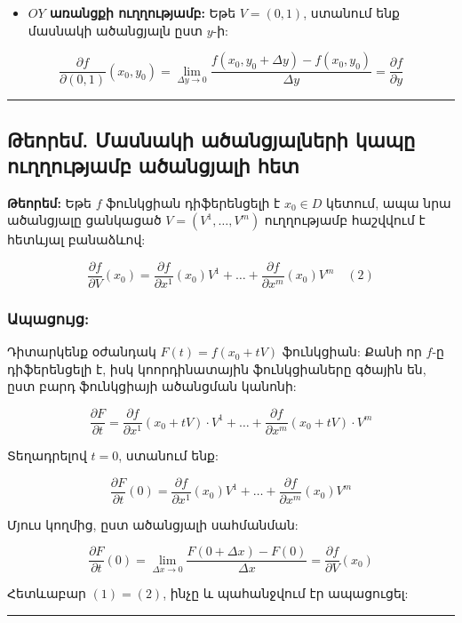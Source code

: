 \documentclass[12pt, a4paper]{article}
\begin{document}
\begin{itemize}
    \item \textbf{$OY$ առանցքի ուղղությամբ:} Եթե $V = (0, 1)$, ստանում ենք մասնակի ածանցյալն ըստ $y$-ի:
\end{itemize}

$$\frac{\partial f}{\partial (0,1)}(x_0, y_0) = \lim_{\Delta y \to 0} \frac{f(x_0, y_0 + \Delta y) - f(x_0, y_0)}{\Delta y} = \frac{\partial f}{\partial y} \text{}$$

\vspace{1em}
\hrule
\vspace{1em}

\subsection{Թեորեմ. Մասնակի ածանցյալների կապը ուղղությամբ ածանցյալի հետ}

\textbf{Թեորեմ:} Եթե $f$ ֆունկցիան դիֆերենցելի է $x_0 \in D$ կետում, ապա նրա ածանցյալը ցանկացած $V = (V^1, \dots, V^m)$ ուղղությամբ հաշվվում է հետևյալ բանաձևով:

$$\frac{\partial f}{\partial V}(x_0) = \frac{\partial f}{\partial x^1}(x_0)V^1 + \dots + \frac{\partial f}{\partial x^m}(x_0)V^m \quad (2) \text{}$$

\subsubsection{Ապացույց:}

Դիտարկենք օժանդակ $F(t) = f(x_0 + tV)$ ֆունկցիան: Քանի որ $f$-ը դիֆերենցելի է, իսկ կոորդինատային ֆունկցիաները գծային են, ըստ բարդ ֆունկցիայի ածանցման կանոնի:

$$\frac{\partial F}{\partial t} = \frac{\partial f}{\partial x^1}(x_0 + tV) \cdot V^1 + \dots + \frac{\partial f}{\partial x^m}(x_0 + tV) \cdot V^m \text{}$$

Տեղադրելով $t=0$, ստանում ենք:

$$\frac{\partial F}{\partial t}(0) = \frac{\partial f}{\partial x^1}(x_0)V^1 + \dots + \frac{\partial f}{\partial x^m}(x_0)V^m \text{}$$

Մյուս կողմից, ըստ ածանցյալի սահմանման:

$$\frac{\partial F}{\partial t}(0) = \lim_{\Delta x \to 0} \frac{F(0 + \Delta x) - F(0)}{\Delta x} = \frac{\partial f}{\partial V}(x_0) \text{}$$

Հետևաբար $(1) = (2)$, ինչը և պահանջվում էր ապացուցել:

\vspace{1em}
\hrule
\vspace{1em}
\end{document}
